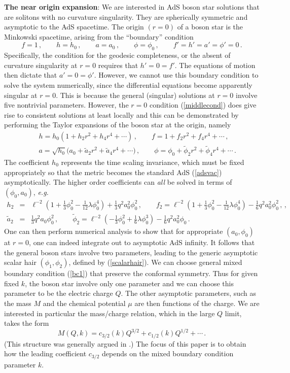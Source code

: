 \documentclass[11pt]{article}
\newcommand{\be}{\begin{equation}}
\newcommand{\ee}{\end{equation}}
\newcommand{\bea}{\setlength\arraycolsep{2pt} \begin{eqnarray}}
\newcommand{\eea}{\end{eqnarray}}
\newcommand{\nn}{\nonumber}
\def\ft#1#2{{\textstyle{\frac{\scriptstyle #1}{\scriptstyle #2} } }}
\begin{document}
{\bf The near origin expansion}: We are interested in AdS boson star solutions that are solitons with no curvature singularity. They are spherically symmetric and asymptotic to the AdS spacetime. The origin $(r=0)$ of a boson star is the Minkowski spacetime, arising from the ``boundary'' condition
\be
f=1\,,\qquad h=h_0\,,\qquad a=a_0\,,\qquad \phi=\phi_0\,,\qquad f'=h'=a'=\phi'=0\,.\label{middlecond}
\ee
Specifically, the condition for the geodesic completeness, or the absent of curvature singularity at $r=0$ requires that $h'=0=f'$. The equations of motion then dictate that $a'=0=\phi'$. However, we cannot use this boundary condition to solve the system numerically, since the differential equations become apparently singular at $r=0$.  This is because the general (singular) solutions at $r=0$  involve five nontrivial parameters. However, the $r=0$ condition (\ref{middlecond}) does give rise to consistent solutions at least locally and this can be demonstrated by performing the Taylor expansions of the boson star at the origin, namely
\bea
&& h=h_0(1 + h_2 r^2 + h_4 r^4 + \cdots)\,,\qquad
f=1 + f_2 r^2 + f_4 r^4 + \cdots\,,\nn\\
&& a=\sqrt{h_0} \Big(a_0 + \tilde a_2 r^2 + \tilde a_4 r^4 + \cdots\Big)\,,\qquad
\phi=\phi_0 + \tilde \phi_2 r^2 + \tilde \phi_4 r^4 + \cdots\,.
\eea
The coefficient $h_0$ represents the time scaling invariance, which must be fixed appropriately so that the metric becomes the standard AdS (\ref{adsvac}) asymptotically. The higher order coefficients can {\it all} be solved in terms of $(\phi_0,a_0)$, {\it e.g.}
\bea
h_2 &=& \ell^{-2} (1 + \ft13 \phi_0^2 -\ft1{12} \lambda \phi_0^4) + \ft1{3} q^2 a_0^2\phi_0^2 \,,\qquad
f_2= \ell^{-2} (1 + \ft13 \phi_0^2 -\ft1{12} \lambda \phi_0^4) - \ft1{6} q^2 a_0^2\phi_0^2 \,,\,,\nn\\
\tilde a_2 &=&\ft13 q^2 a_0 \phi_0^2\,,\qquad\tilde \phi_2 = \ell^{-2} (-\ft13\phi_0^2 + \ft16 \lambda \phi_0^3) -\ft16 q^2 a_0^2\phi_0\,.
\eea
One can then perform numerical analysis to show that for appropriate $(a_0,\phi_0)$ at $r=0$, one can indeed integrate out to asymptotic AdS infinity. It follows that the general boson stars involve two parameters, leading to the generic asymptotic scalar hair $(\phi_1,\phi_2)$, defined by (\ref{scalarhair}). We can choose general mixed boundary condition (\ref{bc1}) that preserve the conformal symmetry. Thus for given fixed $k$, the boson star involve only one parameter and we can choose this parameter to be the electric charge $Q$. The other asymptotic parameters, such as the mass $M$ and the chemical potential $\mu$ are then functions of the charge.  We are interested in particular the mass/charge relation, which in the large $Q$ limit, takes the form
\be
M(Q,k)= c_{3/2} (k) Q^{3/2} + c_{1/2}(k) Q^{1/2} + \cdots\,.
\ee
(This structure was generally argued in \cite{Liu:2020uaz}.)  The focus of this paper is to obtain how the leading coefficient $c_{3/2}$ depends on the mixed boundary condition parameter $k$.
\end{document}
